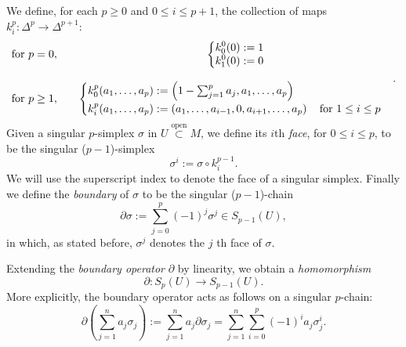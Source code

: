 \begin{defn}[Boundary]
	We define, for each $p \geq 0$ and $0 \leq i \leq p+1$, the collection of maps $k_i^p: \Delta^p \to \Delta^{p+1}$:
	\begin{align}
	\begin{matrix}
		\text{for } p = 0,\quad 
		&\begin{dcases}
			k^0_0(0) := 1\\
			k^0_1(0) := 0\\
		\end{dcases} \\
		\\
		\text{for } p \geq 1,\quad 
		&\begin{cases}
		k_0^p(a_1, \ldots, a_p) := \left( 1 - \sum_{j=1}^{p} a_j, a_1, \ldots, a_p \right)\\
		k_i^p(a_1, \ldots, a_p) := \left( a_1, \ldots, a_{i-1}, 0, a_{i+1}, \ldots, a_p \right) \quad \text{for } 1 \leq i \leq p
	\end{cases} 
	\end{matrix} 
	.\end{align} 
	Given a singular $p$-simplex $\sigma$ in $U \stackrel{\text{open}}{\subset} M$, we define its $i$th \textit{face}, for $0 \leq i \leq p$, to be the singular ($p-1$)-simplex
	\begin{equation}
		\sigma^i := \sigma \circ k_i^{p-1} 
	.\end{equation}
	We will use the superscript index to denote the face of a singular simplex.
	Finally we define the \textit{boundary} of $\sigma$ to be the singular ($p-1$)-chain
	\begin{equation}
		\partial \sigma := \sum_{j=0}^{p} (-1)^j \sigma^j \in S_{p-1}(U)
	,\end{equation} 
	in which, as stated before, $\sigma^j$ denotes the $j$ th face of $\sigma$.

	Extending the \textit{boundary operator} $\partial$ by linearity, we obtain a \textit{homomorphism}
	\begin{equation}
		\partial: S_p(U) \to S_{p-1}(U)
	.\end{equation} 
	More explicitly, the boundary operator acts as follows on a singular $p$-chain:
	\begin{equation}
		\partial \left( \sum_{j=1}^{n} a_j \sigma_j \right) := \sum_{j=1}^{n} a_j \partial \sigma_j = \sum_{j=1}^{n} \sum_{i=0}^{p} (-1)^i a_j \sigma_j^i
	.\end{equation} 
\end{defn}

